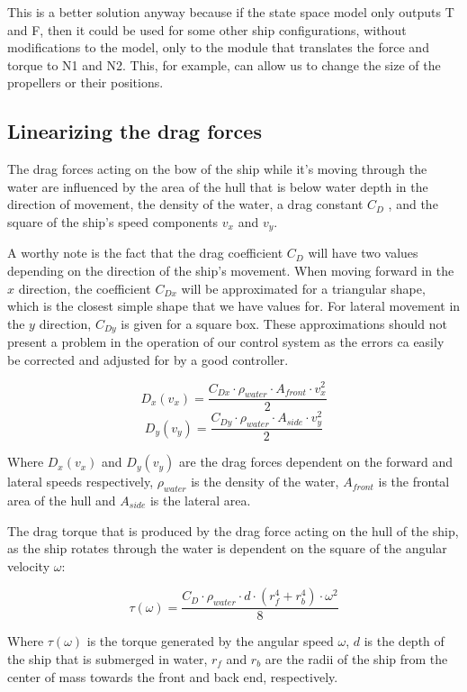 This is a better solution anyway because if the state space model only outputs T and F, then it could be used for some other ship configurations, without modifications to the model, only to the module that translates the force and torque to N1 and N2. This, for example, can allow us to change the size of the propellers or their positions.

\subsection{Linearizing the drag forces}
\label{sect:Linearizing drag forces}

The drag forces acting on the bow of the ship while it's moving through the water are influenced by the area of the hull that is below water depth in the direction of movement, the density of the water, a drag constant $ C_{D} $ , and the square of the ship's speed components $ v_{x} $ and $ v_{y} $. 

A worthy note is the fact that the drag coefficient $ C_{D} $ will have two values depending on the direction of the ship's movement. When moving forward in the $x$ direction, the coefficient $ C_{Dx} $ will be approximated for a triangular shape, which is the closest simple shape that we have values for. For lateral movement in the $y$ direction, $ C_{Dy} $ is given for a square box. These approximations should not present a problem in the operation of our control system as the errors ca easily be corrected and adjusted for by a good controller.

\[ D_{x}(v_{x}) = \frac{C_{Dx}\cdot\rho_{water}\cdot A_{front}\cdot v_{x}^{2}}{2} \]
\[ D_{y}(v_{y}) = \frac{C_{Dy}\cdot\rho_{water}\cdot A_{side}\cdot  v_{y}^{2}}{2} \]

Where $ D_{x}(v_{x}) $ and $ D_{y}(v_{y})$ are the drag forces dependent on the forward and lateral speeds respectively, $ \rho_{water} $ is the density of the water, $ A_{front} $ is the frontal area of the hull and $ A_{side} $ is the lateral area. 

The drag torque that is produced by the drag force acting on the hull of the ship, as the ship rotates through the water is dependent on the square of the angular velocity $ \omega $:

\[ \tau(\omega) = \frac{C_{D} \cdot \rho_{water} \cdot d \cdot (r_{f}^{4} + r_{b}^{4}) \cdot \omega^{2}}{8} \]

Where $ \tau(\omega) $ is the torque generated by the angular speed $ \omega $, $ d  $ is the depth of the ship that is submerged in water, $ r_{f} $ and $ r_{b} $ are the radii of the ship from the center of mass towards the front and back end, respectively.

